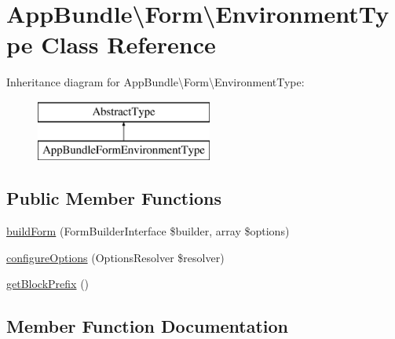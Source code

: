 \hypertarget{class_app_bundle_1_1_form_1_1_environment_type}{}\section{App\+Bundle\textbackslash{}Form\textbackslash{}Environment\+Type Class Reference}
\label{class_app_bundle_1_1_form_1_1_environment_type}
Inheritance diagram for App\+Bundle\textbackslash{}Form\textbackslash{}Environment\+Type\+:\begin{figure}[H]
\begin{center}
\leavevmode
\includegraphics[height=2.000000cm]{class_app_bundle_1_1_form_1_1_environment_type}
\end{center}
\end{figure}
\subsection*{Public Member Functions}
\begin{DoxyCompactItemize}
\item 
\mbox{\hyperlink{class_app_bundle_1_1_form_1_1_environment_type_a49d73fc4e3bf25cf670324750c957c7a}{build\+Form}} (Form\+Builder\+Interface \$builder, array \$options)
\item 
\mbox{\hyperlink{class_app_bundle_1_1_form_1_1_environment_type_a2c5f467c89b99ebdec89fef68deb0838}{configure\+Options}} (Options\+Resolver \$resolver)
\item 
\mbox{\hyperlink{class_app_bundle_1_1_form_1_1_environment_type_a3b35f48ddd80f83d78a2f0cc5814d5fb}{get\+Block\+Prefix}} ()
\end{DoxyCompactItemize}


\subsection{Member Function Documentation}
\mbox{\label{class_app_bundle_1_1_form_1_1_environment_type_a49d73fc4e3bf25cf670324750c957c7a}} 

